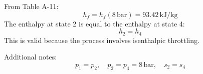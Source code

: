 From Table A-11:  
\[
h_f = h_f(8 \, \text{bar}) = 93.42 \, \text{kJ/kg}
\]  
The enthalpy at state 2 is equal to the enthalpy at state 4:  
\[
h_2 = h_4
\]  
This is valid because the process involves isenthalpic throttling.  

Additional notes:  
\[
p_1 = p_2, \quad p_2 = p_4 = 8 \, \text{bar}, \quad s_2 = s_4
\]